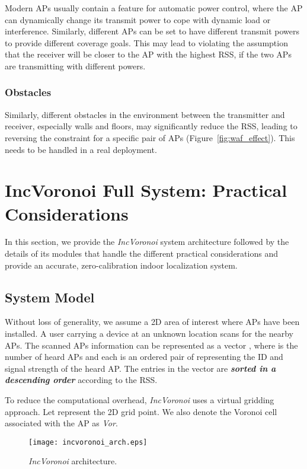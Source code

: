 \documentclass[conference]{IEEEtran}
\def \sys {\textit{IncVoronoi}}
\begin{document}
Modern APs usually contain a feature for automatic power control, where the AP can dynamically change its transmit power to cope with dynamic load or interference. Similarly, different APs can be set to have different transmit powers to provide different coverage goals. This may lead to violating the assumption that the receiver will be closer to the AP with the highest RSS, if the two APs are transmitting with different powers.

\subsubsection{Obstacles}
Similarly, different obstacles in the environment between the transmitter and receiver, especially walls and floors, may significantly reduce the RSS, leading to reversing the constraint for a specific pair of APs (Figure~\ref{fig:waf_effect}). This needs to be handled in a real deployment.

\section{IncVoronoi Full System: Practical Considerations}
\label{sec:system}
In this section, we provide the \sys{} system architecture followed by the details of its modules that handle the different practical considerations and provide an accurate, zero-calibration indoor localization system. 
\subsection{System Model}
Without loss of generality, we assume a 2D area of interest where  APs have been installed. A user carrying a device at an unknown location  scans for the nearby APs. The scanned APs information can be represented as a vector , where  is the number of heard APs and each  is an ordered pair of  representing the ID and signal strength of the  heard AP. The entries in the vector  are \textbf{\emph{sorted in a descending order}} according to the RSS.

To reduce the computational overhead, \sys{} uses a virtual gridding approach. Let  represent the  2D grid point. We also denote the Voronoi cell associated with the  AP as \emph{Vor}.

\begin{figure}[!t]
\centering
\texttt{[image: incvoronoi\_arch.eps]}
\caption{\sys{} architecture.}
\label{fig:arch}
\end{figure}
\end{document}
